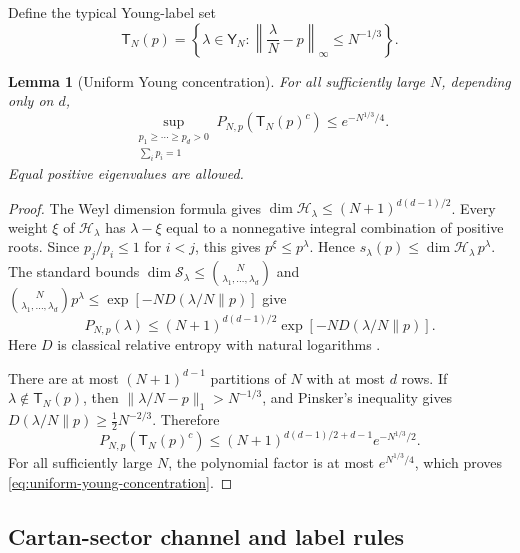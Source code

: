 \documentclass[11pt]{article}
\newtheorem{lemma}[lemma]{Lemma}
\theoremstyle{remark}
\theoremstyle{plain}
\newcommand{\cH}{\mathcal H}
\newcommand{\cS}{\mathcal S}
\begin{document}
Define the typical Young-label set
\begin{equation}\label{eq:young-typical-set}
  \mathsf T_N(p)
  =\left\{\lambda\in\mathsf Y_N:
  \left\|\frac\lambda N-p\right\|_\infty\le N^{-1/3}\right\}.
\end{equation}

\begin{lemma}[Uniform Young concentration]\label{lem:young-concentration}
For all sufficiently large \(N\), depending only on \(d\),
\begin{equation}\label{eq:uniform-young-concentration}
  \sup_{\substack{p_1\ge\cdots\ge p_d>0\\\sum_i p_i=1}}
  P_{N,p}(\mathsf T_N(p)^c)
  \le e^{-N^{1/3}/4}.
\end{equation}
Equal positive eigenvalues are allowed.
\end{lemma}

\begin{proof}
The Weyl dimension formula gives
\(\dim\cH_\lambda\le(N+1)^{d(d-1)/2}\).  Every weight \(\xi\) of
\(\cH_\lambda\) has \(\lambda-\xi\) equal to a nonnegative integral
combination of positive roots.  Since \(p_j/p_i\le1\) for \(i<j\), this gives
\(p^\xi\le p^\lambda\).  Hence
\(s_\lambda(p)\le \dim\cH_\lambda\,p^\lambda\).
The standard bounds
\(\dim\cS_\lambda\le\binom{N}{\lambda_1,\ldots,\lambda_d}\) and
\(\binom{N}{\lambda_1,\ldots,\lambda_d}p^\lambda
\le \exp[-ND(\lambda/N\|p)]\) give
\begin{equation}\label{eq:finite-Young-large-deviation}
  P_{N,p}(\lambda)
  \le (N+1)^{d(d-1)/2}\exp[-ND(\lambda/N\|p)].
\end{equation}
Here \(D\) is classical relative entropy with natural logarithms
\cite{KeylWerner2001Spectrum}.

There are at most \((N+1)^{d-1}\) partitions of \(N\) with at most \(d\)
rows.  If \(\lambda\notin\mathsf T_N(p)\), then
\(\|\lambda/N-p\|_1>N^{-1/3}\), and Pinsker's inequality gives
\(D(\lambda/N\|p)\ge\tfrac12N^{-2/3}\).  Therefore
\[
  P_{N,p}(\mathsf T_N(p)^c)
  \le (N+1)^{d(d-1)/2+d-1}e^{-N^{1/3}/2}.
\]
For all sufficiently large \(N\), the polynomial factor is at most
\(e^{N^{1/3}/4}\), which proves \eqref{eq:uniform-young-concentration}.
\end{proof}

\subsection{Cartan-sector channel and label rules}
\label{sec:cartan-sector-lifting}
\end{document}
